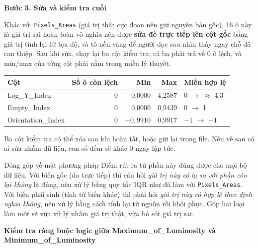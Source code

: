 \documentclass[12pt]{article}
\begin{document}
\noindent
\textbf{Bước 3. Sửa và kiểm tra cuối}

\noindent
Khác với \texttt{Pixels\_Areas} (giá trị thật cực đoan nên giữ nguyên bản gốc), 16 ô này là giá trị sai hoàn toàn vô nghĩa nên được \textbf{sửa đè trực tiếp lên cột gốc} bằng giá trị tính lại từ tọa độ, và tô nền vàng để người đọc sau nhìn thấy ngay chỗ đã can thiệp. Sau khi sửa, chạy lại ba cột kiểm tra; cả ba phải trả về 0 ô lệch, và min/max của từng cột phải nằm trong miền lý thuyết.

\begin{center}
\begin{tabular}{@{}lrrrl@{}}
\toprule
\textbf{Cột} & \textbf{Số ô còn lệch} & \textbf{Min} & \textbf{Max} & \textbf{Miền hợp lệ} \\
\midrule
Log\_Y\_Index       & 0 & 0,0000    & 4,2587 & 0 $\rightarrow$ $\approx$ 4,3 \\
Empty\_Index        & 0 & 0,0000    & 0,9439 & 0 $\rightarrow$ 1 \\
Orientation\_Index  & 0 & $-0,9910$ & 0,9917 & $-1$ $\rightarrow$ $+1$ \\
\bottomrule
\end{tabular}
\end{center}

\noindent
Ba cột kiểm tra có thể xóa sau khi hoàn tất, hoặc giữ lại trong file. Nếu về sau có ai sửa nhầm dữ liệu, con số đếm sẽ khác 0 ngay lập tức.

\begin{guidelinebox}{Đóng góp về mặt phương pháp}
Điểm rút ra từ phần này dùng được cho mọi bộ dữ liệu. Với biến gốc (đo trực tiếp) thì câu hỏi \emph{giá trị này có lạ so với phần còn lại không} là đúng, nên xử lý bằng quy tắc IQR như đã làm với \texttt{Pixels\_Areas}. Với biến phái sinh (tính từ biến khác) thì phải hỏi \emph{giá trị này có hợp lệ theo định nghĩa không}, nên xử lý bằng cách tính lại từ nguồn rồi khôi phục. Gộp hai loại làm một sẽ vừa xử lý nhầm giá trị thật, vừa bỏ sót giá trị sai.
\end{guidelinebox}


\noindent
\textbf{Kiểm tra ràng buộc logic giữa Maximum\_of\_Luminosity và Minimum\_of\_Luminosity}
\end{document}
